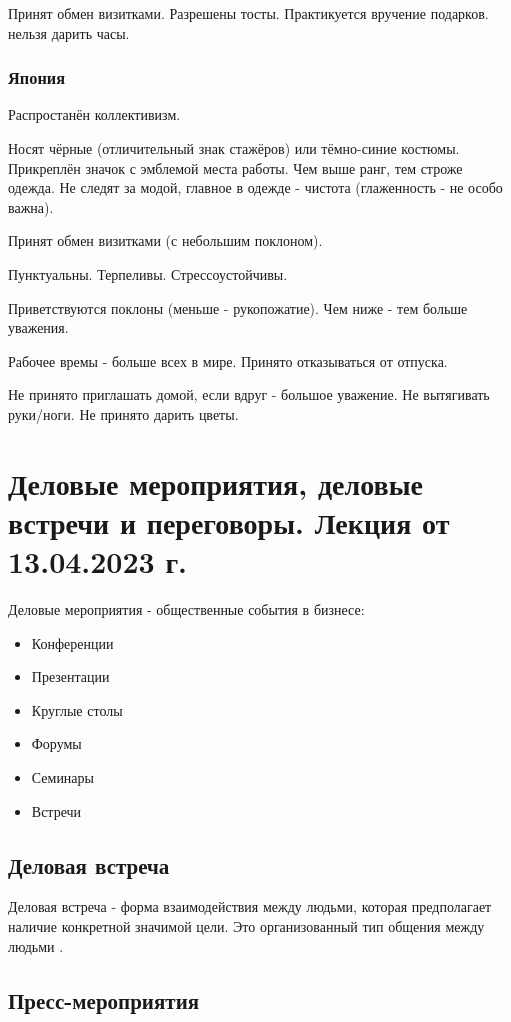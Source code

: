 Принят обмен визитками. Разрешены тосты. Практикуется вручение подарков. нельзя дарить часы.

\subsubsection{Япония}

Распростанён коллективизм.

Носят чёрные (отличительный знак стажёров) или тёмно-синие костюмы.
Прикреплён значок с эмблемой места работы. Чем выше ранг, тем строже одежда.
Не следят за модой, главное в одежде - чистота (глаженность - не особо важна).

Принят обмен визитками (с небольшим поклоном).

Пунктуальны. Терпеливы. Стрессоустойчивы.

Приветствуются поклоны (меньше - рукопожатие). Чем ниже - тем больше уважения.

Рабочее времы - больше всех в мире. Принято отказываться от отпуска.

Не принято приглашать домой, если вдруг - большое уважение. Не вытягивать руки/ноги. Не принято дарить цветы.

\section{Деловые мероприятия, деловые встречи и переговоры. Лекция от 13.04.2023 г.}

Деловые мероприятия - общественные события в бизнесе:
\begin{itemize}
    \item Конференции
    \item Презентации
    \item Круглые столы
    \item Форумы
    \item Семинары
    \item Встречи
\end{itemize}

\subsection{Деловая встреча}

Деловая встреча - форма взаимодействия между людьми, которая предполагает наличие конкретной значимой цели. Это организованный тип общения между людьми \missed{}.

\subsection{Пресс-мероприятия}

